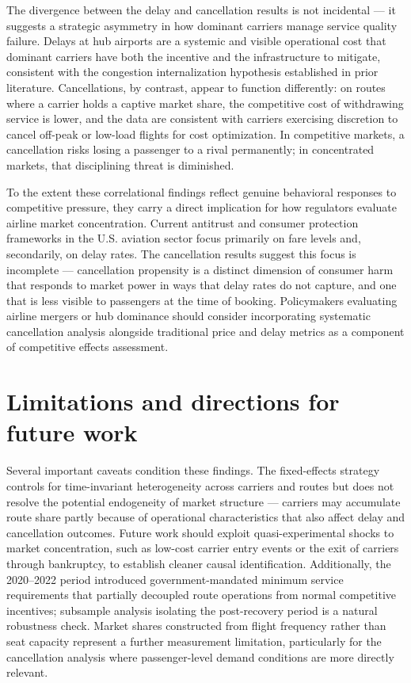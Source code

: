 \documentclass[preprint,12pt,authoryear]{elsarticle}
\begin{document}
The divergence between the delay and cancellation results is not incidental — it suggests a strategic asymmetry in how dominant carriers manage service quality failure. Delays at hub airports are a systemic and visible operational cost that dominant carriers have both the incentive and the infrastructure to mitigate, consistent with the congestion internalization hypothesis established in prior literature. Cancellations, by contrast, appear to function differently: on routes where a carrier holds a captive market share, the competitive cost of withdrawing service is lower, and the data are consistent with carriers exercising discretion to cancel off-peak or low-load flights for cost optimization. In competitive markets, a cancellation risks losing a passenger to a rival permanently; in concentrated markets, that disciplining threat is diminished.

To the extent these correlational findings reflect genuine behavioral responses to competitive pressure, they carry a direct implication for how regulators evaluate airline market concentration. Current antitrust and consumer protection frameworks in the U.S. aviation sector focus primarily on fare levels and, secondarily, on delay rates. The cancellation results suggest this focus is incomplete — cancellation propensity is a distinct dimension of consumer harm that responds to market power in ways that delay rates do not capture, and one that is less visible to passengers at the time of booking. Policymakers evaluating airline mergers or hub dominance should consider incorporating systematic cancellation analysis alongside traditional price and delay metrics as a component of competitive effects assessment.

\section{Limitations and directions for future work}
Several important caveats condition these findings. The fixed-effects strategy controls for time-invariant heterogeneity across carriers and routes but does not resolve the potential endogeneity of market structure — carriers may accumulate route share partly because of operational characteristics that also affect delay and cancellation outcomes. Future work should exploit quasi-experimental shocks to market concentration, such as low-cost carrier entry events or the exit of carriers through bankruptcy, to establish cleaner causal identification. Additionally, the 2020–2022 period introduced government-mandated minimum service requirements that partially decoupled route operations from normal competitive incentives; subsample analysis isolating the post-recovery period is a natural robustness check. Market shares constructed from flight frequency rather than seat capacity represent a further measurement limitation, particularly for the cancellation analysis where passenger-level demand conditions are more directly relevant.
\end{document}
